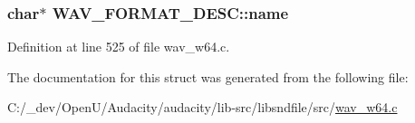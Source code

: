 \subsubsection[{\texorpdfstring{name}{name}}]{ char$\ast$ W\+A\+V\+\_\+\+F\+O\+R\+M\+A\+T\+\_\+\+D\+E\+S\+C\+::name}\hypertarget{struct_w_a_v___f_o_r_m_a_t___d_e_s_c_a9ccaf4801b023f796d9f99bef47507f3}{}\label{struct_w_a_v___f_o_r_m_a_t___d_e_s_c_a9ccaf4801b023f796d9f99bef47507f3}


Definition at line 525 of file wav\+\_\+w64.\+c.



The documentation for this struct was generated from the following file\+:\begin{DoxyCompactItemize}
\item 
C\+:/\+\_\+dev/\+Open\+U/\+Audacity/audacity/lib-\/src/libsndfile/src/\hyperlink{wav__w64_8c}{wav\+\_\+w64.\+c}\end{DoxyCompactItemize}
